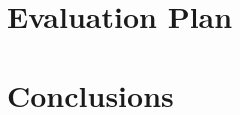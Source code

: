 \documentclass[conference]{IEEEtran}
\begin{document}

\section{Evaluation Plan}
\label{section:evaluation}


\section{Conclusions}\label{section:conclusion}

\end{document}
